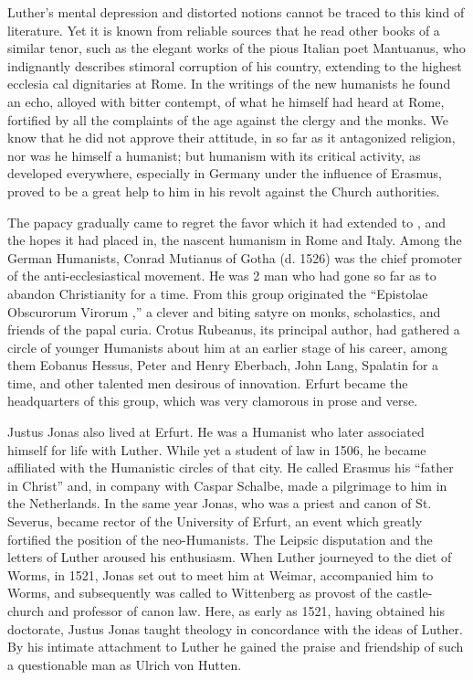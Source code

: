 Luther’s mental depression and distorted notions cannot be traced
to this kind of literature. Yet it is known from reliable sources that
he read other books of a similar tenor, such as the elegant works
of the pious Italian poet Mantuanus, who indignantly describes stimoral
corruption of his country, extending to the highest ecclesia
cal dignitaries at Rome. In the writings of the new humanists he
found an echo, alloyed with bitter contempt, of what he himself
had heard at Rome, fortified by all the complaints of the age against
the clergy and the monks. We know that he did not approve their
attitude, in so far as it antagonized religion, nor was he himself a
humanist; but humanism with its critical activity, as developed everywhere,
especially in Germany under the influence of Erasmus, proved
to be a great help to him in his revolt against the Church authorities.

The papacy gradually came to regret the favor which it had extended to
, and the hopes it had placed in, the nascent humanism
in Rome and Italy. Among the German Humanists, Conrad Mutianus
of Gotha (d. 1526) was the chief promoter of the anti-ecclesiastical
movement. He was 2 man who had gone so far as to abandon Christianity
for a time. From this group originated the “Epistolae Obscurorum Virorum
,” a clever and biting satyre on monks, scholastics, and
friends of the papal curia. Crotus Rubeanus, its principal author,
had gathered a circle of younger Humanists about him at an earlier
stage of his career, among them Eobanus Hessus, Peter and Henry
Eberbach, John Lang, Spalatin for a time, and other talented men
desirous of innovation. Erfurt became the headquarters of this
group, which was very clamorous in prose and verse.

Justus Jonas also lived at Erfurt. He was a Humanist who later
associated himself for life with Luther. While yet a student of law
in 1506, he became affiliated with the Humanistic circles of that
city. He called Erasmus his “father in Christ” and, in company
with Caspar Schalbe, made a pilgrimage to him in the Netherlands.
In the same year Jonas, who was a priest and canon of St. Severus,
became rector of the University of Erfurt, an event which greatly
fortified the position of the neo-Humanists. The Leipsic disputation and
the letters of Luther aroused his enthusiasm. When Luther
journeyed to the diet of Worms, in 1521, Jonas set out to meet him
at Weimar, accompanied him to Worms, and subsequently was
called to Wittenberg as provost of the castle-church and professor
of canon law. Here, as early as 1521, having obtained his doctorate,
Justus Jonas taught theology in concordance with the ideas of Luther.
By his intimate attachment to Luther he gained the praise and friendship
of such a questionable man as Ulrich von Hutten.

